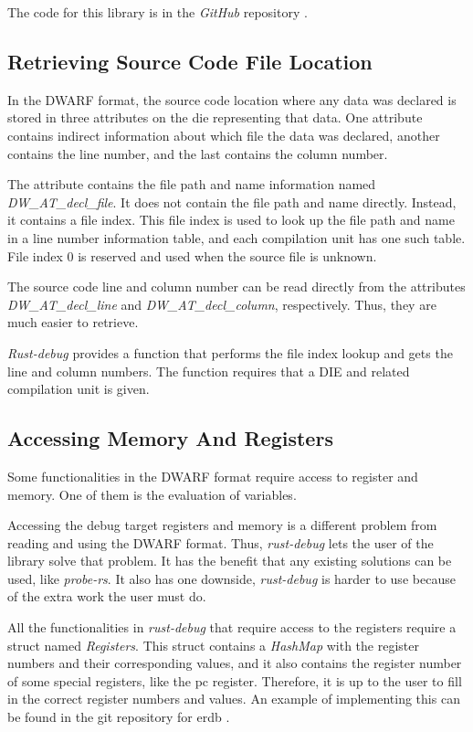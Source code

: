 The code for this library is in the \emph{GitHub} repository \cite{rust-debug}.



\subsection{Retrieving Source Code File Location} \label{sec:decl}
In the \gls{DWARF} format, the source code location where any data was declared is stored in three attributes on the \gls{die} representing that data.
One attribute contains indirect information about which file the data was declared, another contains the line number, and the last contains the column number.


The attribute contains the file path and name information named \emph{DW\_AT\_decl\_file}.
It does not contain the file path and name directly.
Instead, it contains a file index.
This file index is used to look up the file path and name in a line number information table, and each compilation unit has one such table.
File index 0 is reserved and used when the source file is unknown.


The source code line and column number can be read directly from the attributes \emph{DW\_AT\_decl\_line} and \emph{DW\_AT\_decl\_column}, respectively.
Thus, they are much easier to retrieve.


\emph{Rust-debug} provides a function that performs the file index lookup and gets the line and column numbers.
The function requires that a DIE and related compilation unit is given.


\subsection{Accessing Memory And Registers}
Some functionalities in the \gls{DWARF} format require access to register and memory.
One of them is the evaluation of variables.


Accessing the debug target registers and memory is a different problem from reading and using the \gls{DWARF} format.
Thus, \emph{rust-debug} lets the user of the library solve that problem.
It has the benefit that any existing solutions can be used, like \emph{probe-rs}.
It also has one downside, \emph{rust-debug} is harder to use because of the extra work the user must do.


All the functionalities in \emph{rust-debug} that require access to the registers require a struct named \emph{Registers}.
This struct contains a \emph{HashMap} with the register numbers and their corresponding values, and it also contains the register number of some special registers, like the \gls{pc} register.
Therefore, it is up to the user to fill in the correct register numbers and values.
An example of implementing this can be found in the git repository for \gls{erdb} \cite{erdb}.


